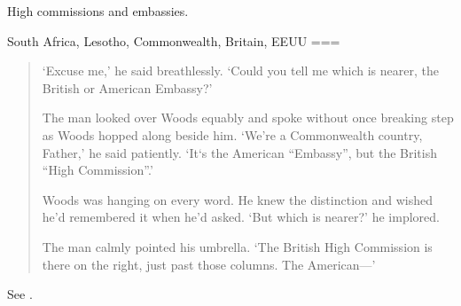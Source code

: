 High commissions and embassies.

South Africa, Lesotho, Commonwealth, Britain, EEUU
===
\begin{quote}
    ‘Excuse me,’ he said breathlessly. ‘Could you tell me which is nearer, the British or American Embassy?’

    The man looked over Woods equably and spoke without once breaking step as Woods hopped along beside him. ‘We’re a Commonwealth country, Father,’ he said patiently. ‘It‘s the American “Embassy”, but the British “High Commission”.’

    Woods was hanging on every word. He knew the distinction and wished he’d remembered it when he’d asked. ‘But which is nearer?’ he implored.

    The man calmly pointed his umbrella. ‘The British High Commission is there on the right, just past those columns. The American—’
\end{quote}
See \cite*[249]{briley1987}.